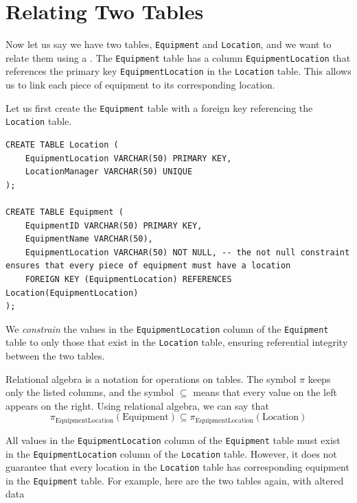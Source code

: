 \section{Relating Two Tables}

Now let us say we have two tables, \texttt{Equipment} and \texttt{Location}, and we want to relate them using a . The \texttt{Equipment} table has a column \texttt{EquipmentLocation} that references the primary key \texttt{EquipmentLocation} in the \texttt{Location} table. This allows us to link each piece of equipment to its corresponding location.

Let us first create the \texttt{Equipment} table with a foreign key referencing the \texttt{Location} table.
\begin{verbatim}
CREATE TABLE Location (
    EquipmentLocation VARCHAR(50) PRIMARY KEY,
    LocationManager VARCHAR(50) UNIQUE
);

CREATE TABLE Equipment (
    EquipmentID VARCHAR(50) PRIMARY KEY,
    EquipmentName VARCHAR(50),
    EquipmentLocation VARCHAR(50) NOT NULL, -- the not null constraint ensures that every piece of equipment must have a location
    FOREIGN KEY (EquipmentLocation) REFERENCES Location(EquipmentLocation)
);
\end{verbatim}

We \emph{constrain} the values in the \texttt{EquipmentLocation} column of the \texttt{Equipment} table to only those that exist in the \texttt{Location} table, ensuring referential integrity between the two tables.

Relational algebra is a notation for operations on tables. The symbol $\pi$ keeps only the listed columns, and the symbol $\subseteq$ means that every value on the left appears on the right. Using relational algebra, we can say that
\[
\pi_{\text{EquipmentLocation}}(\text{Equipment}) \subseteq \pi_{\text{EquipmentLocation}}(\text{Location})
\]

All values in the \texttt{EquipmentLocation} column of the \texttt{Equipment} table must exist in the \texttt{EquipmentLocation} column of the \texttt{Location} table. However, it does not guarantee that every location in the \texttt{Location} table has corresponding equipment in the \texttt{Equipment} table. For example, here are the two tables again, with altered data



